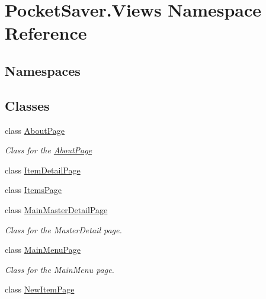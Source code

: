 \hypertarget{namespace_pocket_saver_1_1_views}{}\section{Pocket\+Saver.\+Views Namespace Reference}
\label{namespace_pocket_saver_1_1_views}
\subsection*{Namespaces}
\begin{DoxyCompactItemize}
\end{DoxyCompactItemize}
\subsection*{Classes}
\begin{DoxyCompactItemize}
\item 
class \hyperlink{class_pocket_saver_1_1_views_1_1_about_page}{About\+Page}
\begin{DoxyCompactList}\small\item\em Class for the \hyperlink{class_pocket_saver_1_1_views_1_1_about_page}{About\+Page} \end{DoxyCompactList}\item 
class \hyperlink{class_pocket_saver_1_1_views_1_1_item_detail_page}{Item\+Detail\+Page}
\item 
class \hyperlink{class_pocket_saver_1_1_views_1_1_items_page}{Items\+Page}
\item 
class \hyperlink{class_pocket_saver_1_1_views_1_1_main_master_detail_page}{Main\+Master\+Detail\+Page}
\begin{DoxyCompactList}\small\item\em Class for the Master\+Detail page. \end{DoxyCompactList}\item 
class \hyperlink{class_pocket_saver_1_1_views_1_1_main_menu_page}{Main\+Menu\+Page}
\begin{DoxyCompactList}\small\item\em Class for the Main\+Menu page. \end{DoxyCompactList}\item 
class \hyperlink{class_pocket_saver_1_1_views_1_1_new_item_page}{New\+Item\+Page}
\end{DoxyCompactItemize}
